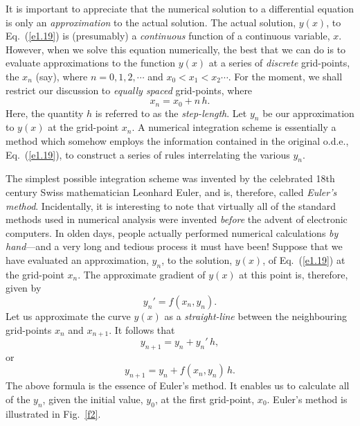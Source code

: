 It is important to appreciate that the numerical solution to a differential
equation is only an {\em approximation}\/ to the actual solution. The actual
solution, $y(x)$, to Eq.~(\ref{e1.19}) is (presumably)
a {\em continuous}\/ function of a continuous
variable, $x$. However, when we solve this equation numerically, the best that we can
do is to evaluate approximations to the
function  $y(x)$ at a series of {\em discrete}\/ grid-points, the $x_n$ (say), where
$n=0,1,2,\cdots$ and $x_0<x_1<x_2 \cdots$. For the moment, we shall restrict our
discussion to {\em equally spaced}\/ grid-points, where
\begin{equation}
x_n = x_0 + n\,h.
\end{equation}
Here, the quantity $h$ is referred to as the {\em step-length}. 
 Let $y_n$ be our approximation
to $y(x)$ at  the grid-point $x_n$. A numerical integration scheme is
essentially a method which somehow employs the information contained in the original
o.d.e., Eq.~(\ref{e1.19}), to construct a series of rules interrelating the
various $y_n$. 

The simplest possible integration scheme was invented by the celebrated
18th century Swiss mathematician Leonhard Euler, and is, therefore, called
{\em Euler's method}. Incidentally, it is interesting to note that virtually
all of the standard methods used in numerical analysis were invented
 {\em  before}\/ the advent of electronic computers. In olden days, people
actually performed numerical calculations {\em by hand}---and a very long and tedious
process it must have been! Suppose that we have evaluated
an  approximation, $y_n$, to the solution, $y(x)$, of Eq.~(\ref{e1.19}) at the grid-point
$x_n$. The approximate gradient of $y(x)$ at this point is, therefore,  given by
\begin{equation}
y_n' = f(x_n,y_n).
\end{equation}
Let us approximate the curve $y(x)$ as a {\em straight-line}\/ between the
neighbouring grid-points $x_n$ and $x_{n+1}$. It follows that
\begin{equation}
y_{n+1} = y_n + y_n'\,h,
\end{equation}
or
\begin{equation}
y_{n+1} = y_n +f(x_n,y_n)\,h.\label{e1.24}
\end{equation}
The above formula is the essence of Euler's method. It enables us to calculate
all of the $y_n$, given the initial value, $y_0$, at the first grid-point,
$x_0$. Euler's method is illustrated in Fig.~\ref{f2}.


